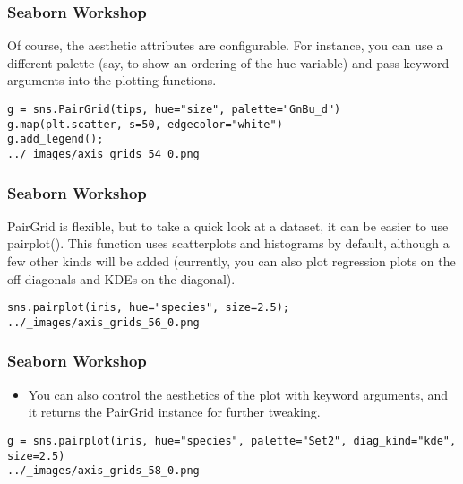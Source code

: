 \begin{frame}[fragile]
	\frametitle{Seaborn Workshop}
	\large
Of course, the aesthetic attributes are configurable. For instance, you can use a different palette (say, to show an ordering of the hue variable) and pass keyword arguments into the plotting functions.
\begin{verbatim}
g = sns.PairGrid(tips, hue="size", palette="GnBu_d")
g.map(plt.scatter, s=50, edgecolor="white")
g.add_legend();
../_images/axis_grids_54_0.png
\end{verbatim}
\end{frame}
\begin{frame}[fragile]
\frametitle{Seaborn Workshop}
\large

PairGrid is flexible, but to take a quick look at a dataset, it can be easier to use pairplot(). This function uses scatterplots and histograms by default, although a few other kinds will be added (currently, you can also plot regression plots on the off-diagonals and KDEs on the diagonal).
\begin{verbatim}
sns.pairplot(iris, hue="species", size=2.5);
../_images/axis_grids_56_0.png
\end{verbatim}

\end{frame}
\begin{frame}[fragile]
	\frametitle{Seaborn Workshop}
	\large
	\begin{itemize}
\item You can also control the aesthetics of the plot with keyword arguments, and it returns the PairGrid instance for further tweaking.

	\end{itemize}
\begin{verbatim}
g = sns.pairplot(iris, hue="species", palette="Set2", diag_kind="kde", size=2.5)
../_images/axis_grids_58_0.png
\end{verbatim}
\end{frame}
